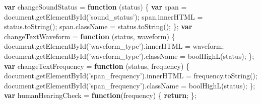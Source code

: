 \documentclass[]{article}
\newenvironment{Shaded}{}{}
\newcommand{\KeywordTok}[1]{\textcolor[rgb]{0.00,0.44,0.13}{\textbf{#1}}}
\newcommand{\StringTok}[1]{\textcolor[rgb]{0.25,0.44,0.63}{#1}}
\newcommand{\VariableTok}[1]{\textcolor[rgb]{0.10,0.09,0.49}{#1}}
\newcommand{\ControlFlowTok}[1]{\textcolor[rgb]{0.00,0.44,0.13}{\textbf{#1}}}
\newcommand{\OperatorTok}[1]{\textcolor[rgb]{0.40,0.40,0.40}{#1}}
\newcommand{\AttributeTok}[1]{\textcolor[rgb]{0.49,0.56,0.16}{#1}}
\newcommand{\NormalTok}[1]{#1}
\begin{document}
\begin{Shaded}
\begin{Highlighting}[]
\KeywordTok{var}\NormalTok{ changeSoundStatus }\OperatorTok{=} \KeywordTok{function}\NormalTok{ (status) }\OperatorTok{\{}
    \KeywordTok{var}\NormalTok{ span }\OperatorTok{=} \VariableTok{document}\NormalTok{.}\AttributeTok{getElementById}\NormalTok{(}\StringTok{'sound_status'}\NormalTok{)}\OperatorTok{;}
    \VariableTok{span}\NormalTok{.}\AttributeTok{innerHTML} \OperatorTok{=} \VariableTok{status}\NormalTok{.}\AttributeTok{toString}\NormalTok{()}\OperatorTok{;}
    \VariableTok{span}\NormalTok{.}\AttributeTok{className} \OperatorTok{=} \VariableTok{status}\NormalTok{.}\AttributeTok{toString}\NormalTok{()}\OperatorTok{;}
\OperatorTok{\};}
\KeywordTok{var}\NormalTok{ changeTextWaveform }\OperatorTok{=} \KeywordTok{function}\NormalTok{ (status}\OperatorTok{,}\NormalTok{ waveform) }\OperatorTok{\{}
    \VariableTok{document}\NormalTok{.}\AttributeTok{getElementById}\NormalTok{(}\StringTok{'waveform_type'}\NormalTok{).}\AttributeTok{innerHTML} \OperatorTok{=}\NormalTok{ waveform}\OperatorTok{;}
    \VariableTok{document}\NormalTok{.}\AttributeTok{getElementById}\NormalTok{(}\StringTok{'waveform_type'}\NormalTok{).}\AttributeTok{className} \OperatorTok{=} \AttributeTok{boolHighL}\NormalTok{(status)}\OperatorTok{;}
\OperatorTok{\};}
\KeywordTok{var}\NormalTok{ changeTextFrequency }\OperatorTok{=} \KeywordTok{function}\NormalTok{ (status}\OperatorTok{,}\NormalTok{ frequency) }\OperatorTok{\{}
    \VariableTok{document}\NormalTok{.}\AttributeTok{getElementById}\NormalTok{(}\StringTok{'span_frequency'}\NormalTok{).}\AttributeTok{innerHTML} \OperatorTok{=} \VariableTok{frequency}\NormalTok{.}\AttributeTok{toString}\NormalTok{()}\OperatorTok{;}
    \VariableTok{document}\NormalTok{.}\AttributeTok{getElementById}\NormalTok{(}\StringTok{'span_frequency'}\NormalTok{).}\AttributeTok{className} \OperatorTok{=} \AttributeTok{boolHighL}\NormalTok{(status)}\OperatorTok{;} 
\OperatorTok{\};}
\KeywordTok{var}\NormalTok{ humanHearingCheck }\OperatorTok{=} \KeywordTok{function}\NormalTok{(frequency) }\OperatorTok{\{}
    \ControlFlowTok{return}\OperatorTok{;}
\OperatorTok{\};}
\end{Highlighting}
\end{Shaded}
\end{document}
